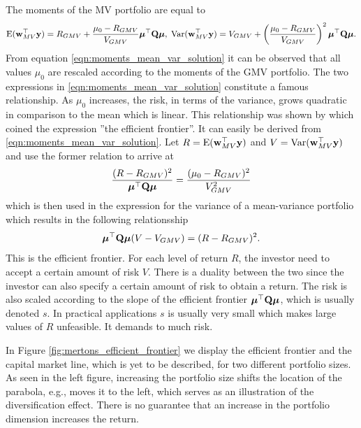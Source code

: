 \documentclass[12pt, oneside]{book}\usepackage{knitr}
\begin{document}
{The moments of the MV portfolio are equal to
\begin{equation}\label{eqn:moments_mean_var_solution}
\operatorname{E}(\mathbf{w}_{MV}^\top\mathbf{y}) = R_{GMV} + \frac{\mu_0 - R_{GMV}}{V_{GMV}} \mbox{\boldmath$\mu$}^\top \mathbf{Q} \mbox{\boldmath$\mu$}, \;
\operatorname{Var}(\mathbf{w}_{MV}^\top\mathbf{y}) =V_{GMV} + \left(\frac{\mu_0 - R_{GMV}}{V_{GMV}}\right)^2 \mbox{\boldmath$\mu$}^\top \mathbf{Q} \mbox{\boldmath$\mu$}.
\end{equation}
From equation \eqref{eqn:moments_mean_var_solution} it can be observed that all values $\mu_0$ are rescaled according to the moments of the GMV portfolio. 
The two expressions in \eqref{eqn:moments_mean_var_solution} constitute a famous relationship. 
As $\mu_0$ increases, the risk, in terms of the variance, grows quadratic in comparison to the mean which is linear. 
This relationship was shown by \citet{merton1972} which coined the expression ''the efficient frontier''.
It can easily be derived from \eqref{eqn:moments_mean_var_solution}.
Let $R =\operatorname{E}(\mathbf{w}_{MV}^\top\mathbf{y})$ and $V=\operatorname{Var}(\mathbf{w}_{MV}^\top\mathbf{y})$ and use the former relation to arrive at 
$$
\frac{(R-R_{GMV})^2}{\mbox{\boldmath$\mu$}^\top \mathbf{Q} \mbox{\boldmath$\mu$}} = \frac{(\mu_0 - R_{GMV})^2}{V_{GMV}^2}
$$
which is then used in the expression for the variance of a mean-variance portfolio which results in the following relationsship
\begin{equation}\label{eqn:efficient_frontier}
\mbox{\boldmath$\mu$}^\top \mathbf{Q} \mbox{\boldmath$\mu$} (V - V_{GMV}) = (R - R_{GMV})^2.
\end{equation}
This is the efficient frontier.
For each level of return $R$, the investor need to accept a certain amount of risk $V$.
There is a duality between the two since the investor can also specify a certain amount of risk to obtain a return.
The risk is also scaled according to the slope of the efficient frontier $\mbox{\boldmath$\mu$}^\top \mathbf{Q} \mbox{\boldmath$\mu$}$, which is usually denoted $s$.
In practical applications $s$ is usually very small which makes large values of $R$ unfeasible.
It demands to much risk.

In Figure \ref{fig:mertons_efficient_frontier} we display the efficient frontier and the capital market line, which is yet to be described, for two different portfolio sizes. 
As seen in the left figure, increasing the portfolio size shifts the location of the parabola, e.g., moves it to the left, which serves as an illustration of the diversification effect. 
There is no guarantee that an increase in the portfolio dimension increases the return.
\begin{knitrout}\small
{}\color{fgcolor}\begin{figure}


\end{figure}
\end{knitrout}}
\end{document}
